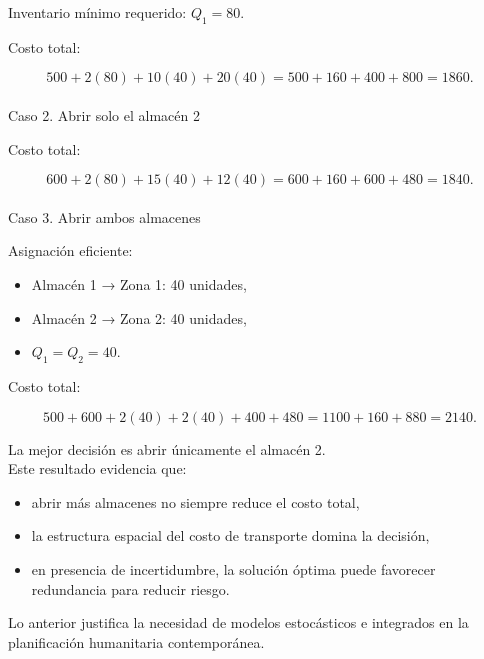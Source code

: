 \documentclass[
  spanish,
  letterpaper,
  DIV=11,
  numbers=noendperiod]{scrartcl}
\makeatletter
\let\oldparagraph\paragraph
\renewcommand{\paragraph}{
    \@ifstar
      \xxxParagraphStar
      \xxxParagraphNoStar
  }
\newcommand{\xxxParagraphStar}[1]{\oldparagraph*{#1}\mbox{}}
\newcommand{\xxxParagraphNoStar}[1]{\oldparagraph{#1}\mbox{}}
\providecommand{\tightlist}{%
  \setlength{\itemsep}{0pt}\setlength{\parskip}{0pt}}
\makeatother
\begin{document}
Inventario mínimo requerido: \(Q_1 = 80\).

Costo total:

\[
500 + 2(80) + 10(40) + 20(40)
= 500 + 160 + 400 + 800 = 1860.
\]

\paragraph{Caso 2. Abrir solo el almacén
2}\label{caso-2.-abrir-solo-el-almacuxe9n-2}

Costo total:

\[
600 + 2(80) + 15(40) + 12(40)
= 600 + 160 + 600 + 480 = 1840.
\]

\paragraph{Caso 3. Abrir ambos
almacenes}\label{caso-3.-abrir-ambos-almacenes}

Asignación eficiente:

\begin{itemize}
\tightlist
\item
  Almacén 1 → Zona 1: 40 unidades,\\
\item
  Almacén 2 → Zona 2: 40 unidades,\\
\item
  \(Q_1 = Q_2 = 40\).
\end{itemize}

Costo total:

\[
500 + 600 + 2(40) + 2(40) + 400 + 480
= 1100 + 160 + 880 = 2140.
\]

La mejor decisión es abrir únicamente el almacén 2.\\
Este resultado evidencia que:

\begin{itemize}
\tightlist
\item
  abrir más almacenes no siempre reduce el costo total,\\
\item
  la estructura espacial del costo de transporte domina la decisión,\\
\item
  en presencia de incertidumbre, la solución óptima puede favorecer
  redundancia para reducir riesgo.
\end{itemize}

Lo anterior justifica la necesidad de modelos estocásticos e integrados
en la planificación humanitaria contemporánea.
\end{document}
